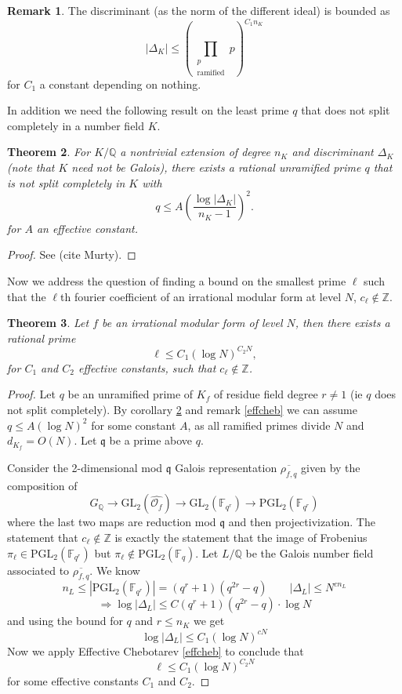 \documentclass[12pt]{amsart}
\newtheorem{thm}{Theorem}[section]
\theoremstyle{definition}
\newtheorem{rem}[thm]{Remark}
\def\F{{\mathbb F}}
\def\O{{\mathcal O}}
\def\Q{{\mathbb Q}}
\def\Z{{\mathbb Z}}
\newcommand{\GL}{\text{GL}}
\newcommand{\PGL}{\text{PGL}}
\renewcommand{\bar}{\overline}
\newcommand{\pfrac}[2]{\left( \frac{#1}{#2} \right)}
\begin{document}
\begin{rem}\label{bounddisc} The discriminant (as the norm of the different ideal) is bounded as
\[|\Delta_K| \leq \left( \prod_{\substack{p \\ \text{ramified}}} p \right)^{C_1n_K} \]
for $C_1$ a constant depending on nothing.
\end{rem}

In addition we need the following result on the least prime $q$ that does not split completely in a number field $K$.

\begin{thm}\label{nonsplitcom}
For $K/\Q$ a nontrivial extension of degree $n_K$ and discriminant $\Delta_K$ (note that $K$ need not be Galois), there exists a rational unramified prime $q$ that is not split completely in $K$ with
\[ q \leq A\pfrac{\log |\Delta_K|}{n_K-1}^2.\] 
for $A$ an effective constant.
\end{thm}
\begin{proof}
See (cite Murty).
\end{proof}

Now we address the question of finding a bound on the smallest prime $\ell$ such that the $\ell$th fourier coefficient of an irrational modular form at level $N$, $c_\ell \not\in\Z$.

\begin{thm}\label{notinZ}
Let $f$ be an irrational modular form of level $N$, then there exists a rational prime
\[\ell \leq C_1 \left( \log{N} \right)^{C_2N},  \]
for $C_1$ and $C_2$ effective constants, such that $c_\ell \not\in \Z$.
\end{thm}
\begin{proof}
Let $q$ be an unramified prime of $K_f$ of residue field degree $r \neq 1$ (ie $q$ does not split completely).  By corollary \ref{nonsplitcom} and remark \ref{effcheb} we can assume $q \leq A(\log N)^2$ for some constant $A$, as all ramified primes divide $N$ and $d_{K_f} = O(N)$.  Let $\mathfrak{q}$ be a prime above $q$.

Consider the 2-dimensional mod $\mathfrak{q}$ Galois representation $\bar{\rho_{f,q}}$ given by the composition of
\[ G_{\Q} \rightarrow\GL_2(\hat{\O_f}) \rightarrow \GL_2(\F_{q^r}) \rightarrow \PGL_2(\F_{q^r})  \]
where the last two maps are reduction mod $\mathfrak{q}$ and then projectivization.  The statement that $c_\ell \not\in \Z$ is exactly the statement that the image of Frobenius $\pi_\ell \in \PGL_2(\F_{q^r})$ but $\pi_\ell \not\in \PGL_2(\F_q)$.  Let $L/\Q$ be the Galois number field associated to $\bar{\rho_{f,q}}$.  We know
\[ n_L \leq |\PGL_2(\F_{q^r})| = (q^{r}+1)(q^{2r}-q) \qquad |\Delta_L| \leq N^{cn_L} \]
\[\Rightarrow \log|\Delta_L| \leq C(q^{r}+1)(q^{2r}-q) \cdot \log{N} \]
and using the bound for $q$ and $r \leq n_K$ we get
\[  \log|\Delta_L| \leq C_1 \left( \log{N} \right)^{cN} \]
Now we apply Effective Chebotarev \ref{effcheb} to conclude that
\[ \ell \leq C_1 \left( \log{N} \right)^{C_2N} \]
for some effective constants $C_1$ and $C_2$.
\end{proof}
\end{document}
